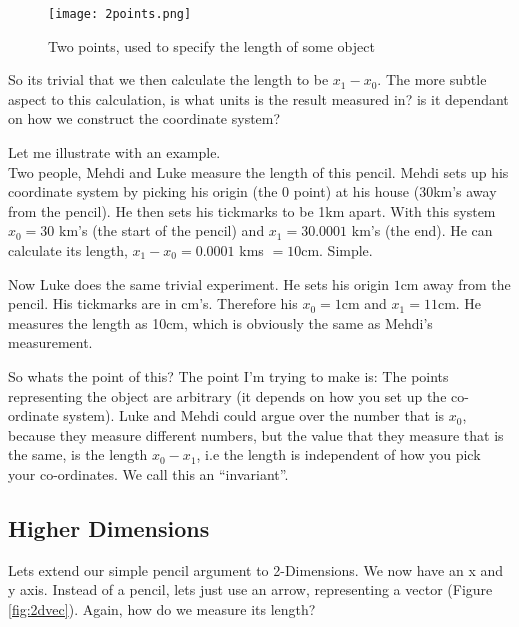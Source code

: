 \begin{figure}[h]
  \centering
  \texttt{[image: 2points.png]}
  \caption{Two points, used to specify the length of some object}
  \label{fig:pp}
\end{figure}

So its trivial that we then calculate the length to be $x_1 - x_0$. The more subtle aspect to this calculation, is what units is the result measured in? is it dependant on how we construct the coordinate system? 

Let me illustrate with an example. \\

Two people, Mehdi and Luke measure the length of this pencil. Mehdi sets up his coordinate system by picking his origin (the 0 point) at his house (30km's away from the pencil). He then sets his tickmarks to be 1km apart. With this system $x_0 = 30$ km's (the start of the pencil) and $x_1 = 30.0001$ km's (the end).  He can calculate its length, $x_1 - x_0 = 0.0001$ kms $ = 10$cm. Simple. 

Now Luke does the same trivial experiment. He sets his origin $1$cm away from the pencil. His tickmarks are in cm's. Therefore his $x_0 = 1$cm and $x_1 = 11$cm. He measures the length as 10cm, which is obviously the same as Mehdi's measurement. 

So whats the point of this? The point I'm trying to make is: The points representing the object are arbitrary (it depends on how you set up the co-ordinate system). Luke and Mehdi could argue over the number that is $x_0$, because they measure different numbers, but the value that they measure that is the same, is the length $x_0 - x_1$, i.e the length is independent of how you pick your co-ordinates. We call this an ``invariant''. 


  \subsection{Higher Dimensions}
  Lets extend our simple pencil argument to 2-Dimensions. We now have an x and y axis. Instead of a pencil, lets just use an arrow, representing a vector (Figure \ref{fig:2dvec}). Again, how do we measure its length? 

